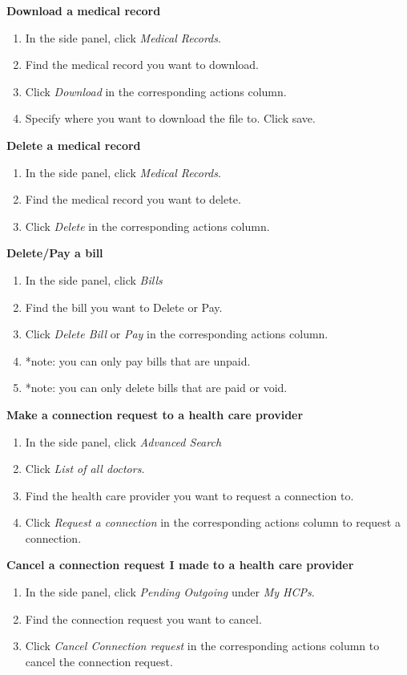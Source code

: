 \documentclass[10pt]{report}
\begin{document}
\textbf{Download a medical record}
\begin{enumerate}
\item In the side panel, click \textit{Medical Records}.
\item Find the medical record you want to download.
\item Click \textit{Download} in the corresponding actions column.
\item Specify where you want to download the file to. Click save.
\end{enumerate}
\textbf{Delete a medical record}
\begin{enumerate}
\item In the side panel, click \textit{Medical Records}.
\item Find the medical record you want to delete.
\item Click \textit{Delete} in the corresponding actions column.
\end{enumerate}
\textbf{Delete/Pay a bill}
\begin{enumerate}
\item In the side panel, click \textit{Bills}
\item Find the bill you want to Delete or Pay.
\item Click \textit{Delete Bill} or \textit{Pay} in the corresponding actions column.
\item *note: you can only pay bills that are unpaid.
\item *note: you can only delete bills that are paid or void.
\end{enumerate}
\textbf{Make a connection request to a health care provider}
\begin{enumerate}
\item In the side panel, click \textit{Advanced Search}
\item Click \textit{List of all doctors}.
\item Find the health care provider you want to request a connection to.
\item Click \textit{Request a connection} in the corresponding actions column to request a connection.
\end{enumerate}
\textbf{Cancel a connection request I made to a health care provider}
\begin{enumerate}
\item In the side panel, click \textit{Pending Outgoing} under \textit{My HCPs}.
\item Find the connection request you want to cancel.
\item Click \textit{Cancel Connection request} in the corresponding actions column to cancel the connection request.
\end{enumerate}
\end{document}
